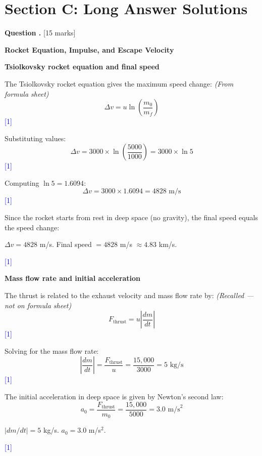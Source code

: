 \documentclass[12pt,a4paper]{article}
\newcounter{questioncounter}
\newcommand{\question}[1]{%
  \stepcounter{questioncounter}%
  \vspace{0.5cm}%
  \noindent\textbf{Question \thequestioncounter.} \hfill [#1 marks]%
  \vspace{0.2cm}%
  \par%
}
\newcommand{\markstep}[1]{\hfill\textcolor{blue}{[#1]}}
\newcommand{\finalanswer}[1]{%
  \begin{tcolorbox}[colback=green!5!white,colframe=green!50!black,boxrule=0.5pt]
  #1
  \end{tcolorbox}
}
\newcommand{\fromsheet}{\textit{(From formula sheet)}}
\newcommand{\recalled}{\textit{(Recalled --- not on formula sheet)}}
\begin{document}
\newpage

\section*{Section C: Long Answer Solutions}

\setcounter{questioncounter}{0}

\question{15}

\noindent\textbf{Rocket Equation, Impulse, and Escape Velocity}

\begin{parts}

\item \textbf{Tsiolkovsky rocket equation and final speed} 

The Tsiolkovsky rocket equation gives the maximum speed change: \fromsheet
\[
\Delta v = u\ln\!\left(\frac{m_0}{m_f}\right)
\]
\markstep{1}

Substituting values:
\[
\Delta v = 3000\times\ln\!\left(\frac{5000}{1000}\right) = 3000\times\ln 5
\]
\markstep{1}

Computing $\ln 5 = 1.6094$:
\[
\Delta v = 3000\times 1.6094 = 4828\text{ m/s}
\]
\markstep{1}

Since the rocket starts from rest in deep space (no gravity), the final speed equals the speed change:

\finalanswer{$\Delta v = 4828$ m/s. Final speed $= 4828$ m/s $\approx 4.83$ km/s.}
\markstep{1}

\item \textbf{Mass flow rate and initial acceleration} 

The thrust is related to the exhaust velocity and mass flow rate by: \recalled
\[
F_{\text{thrust}} = u\left|\frac{dm}{dt}\right|
\]
\markstep{1}

Solving for the mass flow rate:
\[
\left|\frac{dm}{dt}\right| = \frac{F_{\text{thrust}}}{u} = \frac{15{,}000}{3000} = 5\text{ kg/s}
\]
\markstep{1}

The initial acceleration in deep space is given by Newton's second law:
\[
a_0 = \frac{F_{\text{thrust}}}{m_0} = \frac{15{,}000}{5000} = 3.0\text{ m/s}^2
\]

\finalanswer{$|dm/dt| = 5$ kg/s. \quad $a_0 = 3.0$ m/s$^2$.}
\markstep{1}


\end{parts}
\end{document}
